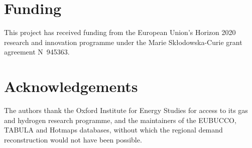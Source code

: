 \documentclass[review]{elsarticle}
\begin{document}
\section*{Funding}
This project has received funding from the European Union's Horizon 2020 research and
innovation programme under the Marie Sk\l{}odowska-Curie grant agreement
N\textdegree{}~945363.

\section*{Acknowledgements}
The authors thank the Oxford Institute for Energy Studies for access to its gas and
hydrogen research programme, and the maintainers of the EUBUCCO, TABULA and Hotmaps
databases, without which the regional demand reconstruction would not have been possible.



\end{document}
